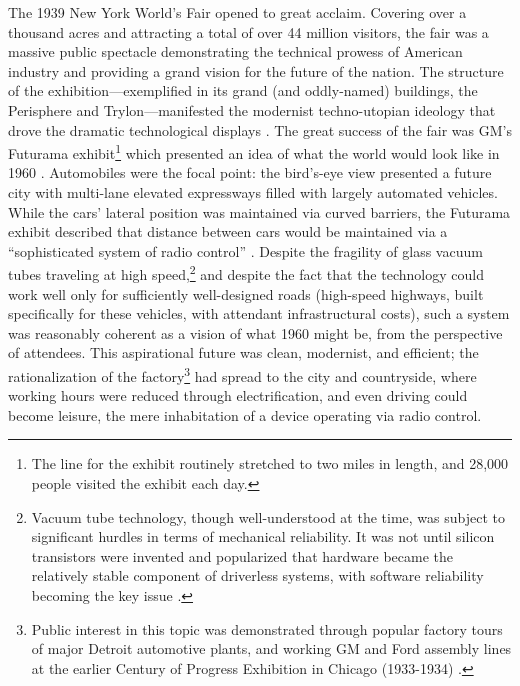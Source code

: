 
The 1939 New York World's Fair opened to great acclaim. Covering over
a thousand acres and attracting a total of over 44 million visitors,
the fair was a massive public spectacle demonstrating the technical
prowess of American industry and providing a grand vision for the
future of the nation. The structure of the exhibition---exemplified in
its grand (and oddly-named) buildings, the Perisphere and
Trylon---manifested the modernist techno-utopian ideology that drove the
dramatic technological displays \cite[p. 371]{nyeElectrifying}. The
great success of the fair was 
GM's Futurama exhibit\footnote{The line for the exhibit routinely stretched to
two miles in length, and 28,000 people visited the exhibit each day.}
which presented an idea of what the world would look
like in 1960 \cite[p. 3-4]{wetmore}. Automobiles were the focal
point: the bird's-eye view presented a 
future city with multi-lane elevated expressways filled with largely
automated vehicles. While the cars' lateral position was maintained via
curved barriers, the Futurama exhibit described that distance
between cars would be maintained via a ``sophisticated system of radio
control'' \cite[p. 5]{wetmore}. Despite the 
fragility of glass vacuum tubes traveling at high
speed,\footnote{Vacuum tube technology, though well-understood at the time,
was subject to significant hurdles in terms of mechanical
reliability. It was not until silicon transistors were invented and
popularized that
hardware became the relatively stable component of driverless systems,
with software reliability becoming the key issue \cite[p.
  15]{wetmore}.} and despite the fact
that the technology could work well only for sufficiently
well-designed roads (high-speed highways, built specifically for these
vehicles, with attendant infrastructural costs), such a system was
reasonably coherent as a vision of what 1960 might be, from the
perspective of attendees. This aspirational future was clean,
modernist, and efficient; the rationalization of the
factory\footnote{Public interest in this topic was demonstrated through
  popular factory tours of major Detroit automotive 
  plants, and 
working GM and Ford assembly lines at the earlier Century of Progress
Exhibition in Chicago (1933-1934) \cite[p. 63-64]{nyeAmericas}.} had
spread to the city and 
countryside, where working hours were reduced through electrification,
and even driving could become leisure, the mere inhabitation of a
device operating via radio control.

